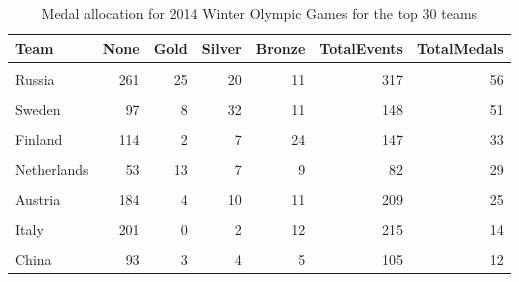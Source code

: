 \documentclass[
]{article}
\begin{document}
\begin{table}[H]
\centering
\caption{\label{tab:WinterBreakDownWinners2}Medal allocation for 2014 Winter Olympic Games for the top 30 teams}
\centering
\fontsize{7}{9}\selectfont
\begin{tabular}[t]{lrrrrrr}
\toprule
Team & None & Gold & Silver & Bronze & TotalEvents & TotalMedals\\
\midrule
\cellcolor{gray!10}{Canada} & \cellcolor{gray!10}{241} & \cellcolor{gray!10}{57} & \cellcolor{gray!10}{20} & \cellcolor{gray!10}{5} & \cellcolor{gray!10}{323} & \cellcolor{gray!10}{82}\\
Russia & 261 & 25 & 20 & 11 & 317 & 56\\
\cellcolor{gray!10}{United States} & \cellcolor{gray!10}{281} & \cellcolor{gray!10}{8} & \cellcolor{gray!10}{28} & \cellcolor{gray!10}{16} & \cellcolor{gray!10}{333} & \cellcolor{gray!10}{52}\\
Sweden & 97 & 8 & 32 & 11 & 148 & 51\\
\cellcolor{gray!10}{Norway} & \cellcolor{gray!10}{183} & \cellcolor{gray!10}{18} & \cellcolor{gray!10}{5} & \cellcolor{gray!10}{13} & \cellcolor{gray!10}{219} & \cellcolor{gray!10}{36}\\
\addlinespace
Finland & 114 & 2 & 7 & 24 & 147 & 33\\
\cellcolor{gray!10}{Germany} & \cellcolor{gray!10}{203} & \cellcolor{gray!10}{13} & \cellcolor{gray!10}{12} & \cellcolor{gray!10}{7} & \cellcolor{gray!10}{235} & \cellcolor{gray!10}{32}\\
Netherlands & 53 & 13 & 7 & 9 & 82 & 29\\
\cellcolor{gray!10}{Switzerland} & \cellcolor{gray!10}{187} & \cellcolor{gray!10}{6} & \cellcolor{gray!10}{2} & \cellcolor{gray!10}{20} & \cellcolor{gray!10}{215} & \cellcolor{gray!10}{28}\\
Austria & 184 & 4 & 10 & 11 & 209 & 25\\
\addlinespace
\cellcolor{gray!10}{France} & \cellcolor{gray!10}{171} & \cellcolor{gray!10}{4} & \cellcolor{gray!10}{4} & \cellcolor{gray!10}{10} & \cellcolor{gray!10}{189} & \cellcolor{gray!10}{18}\\
Italy & 201 & 0 & 2 & 12 & 215 & 14\\
\cellcolor{gray!10}{South Korea} & \cellcolor{gray!10}{104} & \cellcolor{gray!10}{7} & \cellcolor{gray!10}{5} & \cellcolor{gray!10}{2} & \cellcolor{gray!10}{118} & \cellcolor{gray!10}{14}\\
China & 93 & 3 & 4 & 5 & 105 & 12\\

\end{tabular}
\end{table}
\end{document}
